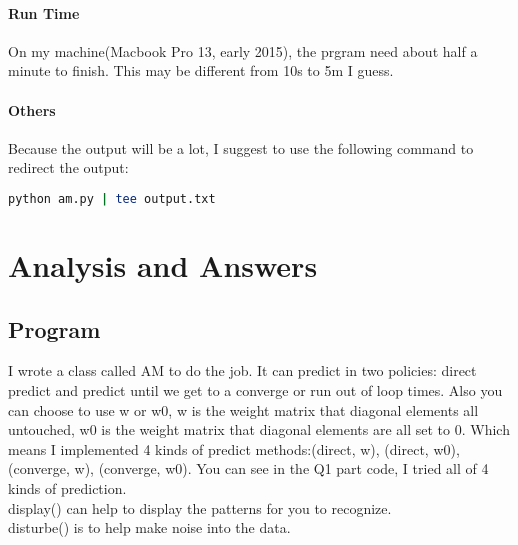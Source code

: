 \documentclass{article}
\begin{document}
  \paragraph{Run Time}
  On my machine(Macbook Pro 13, early 2015), the prgram need about half a
  minute to finish. This may be different from 10s to 5m I guess.
  \paragraph{Others}
  Because the output will be a lot, I suggest to use the following command to
  redirect the output:\\
  \begin{lstlisting}[language=Bash]
  python am.py | tee output.txt
  \end{lstlisting}

  \section{Analysis and Answers}
  \subsection{Program}
  I wrote a class called AM to do the job. It can predict in two policies:
  direct predict and predict until we get to a converge or run out of loop
  times. Also you can choose to use w or w0, w is the weight matrix that
  diagonal elements all untouched, w0 is the weight matrix that diagonal
  elements are all set to 0. Which means I implemented 4 kinds of predict
  methods:(direct, w), (direct, w0), (converge, w), (converge, w0). You can see
  in the Q1 part code, I tried all of 4 kinds of prediction.\\
  display() can help to display the patterns for you to recognize.\\
  disturbe() is to help make noise into the data.
  
\end{document}
